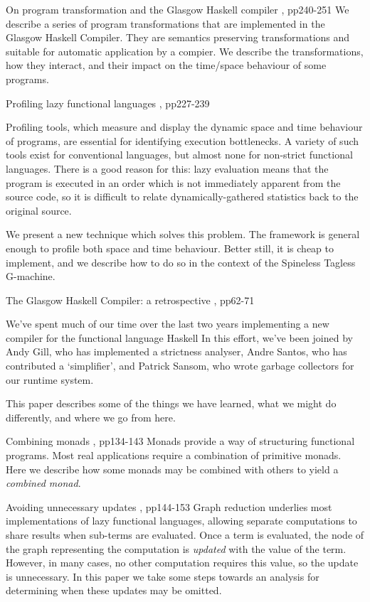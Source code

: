 {On program transformation and the Glasgow Haskell compiler}
{\GlasgowNinetyTwo{}, pp240-251}
{We describe a series of program transformations that are implemented
in the Glasgow Haskell Compiler.  They are semantics preserving
transformations and suitable for automatic application by a compier.
We describe the transformations, how they interact, and their impact
on the time/space behaviour of some programs.}

{Profiling lazy functional languages}
{\GlasgowNinetyTwo{}, pp227-239}
{Profiling tools, which measure and display the dynamic space
and time behaviour of programs, are essential for identifying
execution bottlenecks.  A variety of such tools exist for conventional
languages, but almost none for non-strict functional languages.  There
is a good reason for this: lazy evaluation means that the program is
executed in an order which is not immediately apparent from the source
code, so it is difficult to relate dynamically-gathered statistics
back to the original source.

We present a new technique which solves this problem.  The framework is
general enough to profile both space and time behaviour.  Better still,
it is cheap to implement, and we describe how to do so in the
context of the Spineless Tagless G-machine.
}

{The Glasgow Haskell Compiler: a retrospective}
{\GlasgowNinetyTwo{}, pp62-71}
{We've spent much of our time over the last
two years implementing a new compiler for the functional language Haskell
In this effort, we've been joined by Andy Gill, who has implemented a
strictness analyser, Andre Santos, who has contributed a `simplifier', and
Patrick Sansom, who wrote garbage collectors for our runtime system.

This paper describes some of the things we have learned, what we might 
do differently, and where we go from here.
}

{Combining monads}
{\GlasgowNinetyTwo{}, pp134-143}
{Monads provide a way of structuring functional programs.
Most real applications require a combination of primitive monads.
Here we describe how some monads may be combined with others to
yield a {\em combined monad}.}

{Avoiding unnecessary updates}
{\GlasgowNinetyTwo{}, pp144-153}
{Graph reduction underlies most implementations of lazy functional
languages, allowing separate computations to share results when
sub-terms are evaluated. Once a term is evaluated, the node of the
graph representing the computation is {\em updated} with the value of
the term. However, in many cases, no other computation requires this
value, so the update is unnecessary. In this paper we take some steps
towards an analysis for determining when these updates may be omitted.
}

